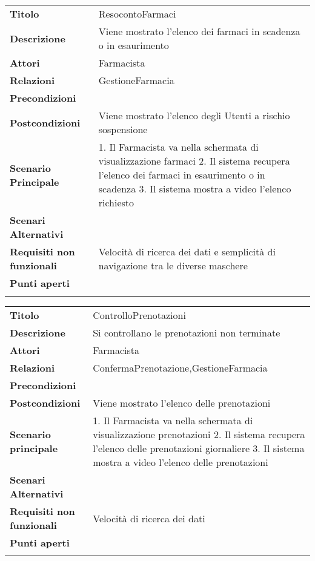 \begin{longtable}[c]{@{}ll@{}}
\toprule\addlinespace
\textbf{Titolo} & ResocontoFarmaci
\\\addlinespace
\textbf{Descrizione} & Viene mostrato l'elenco dei farmaci in scadenza o
in esaurimento
\\\addlinespace
\textbf{Attori} & Farmacista
\\\addlinespace
\textbf{Relazioni} & GestioneFarmacia
\\\addlinespace
\textbf{Precondizioni} &
\\\addlinespace
\textbf{Postcondizioni} & Viene mostrato l'elenco degli Utenti a rischio
sospensione
\\\addlinespace
\textbf{Scenario Principale} & 1. Il Farmacista va nella schermata di
visualizzazione farmaci 2. Il sistema recupera l'elenco dei farmaci in
esaurimento o in scadenza 3. Il sistema mostra a video l'elenco
richiesto
\\\addlinespace
\textbf{Scenari Alternativi} &
\\\addlinespace
\textbf{Requisiti non funzionali} & Velocità di ricerca dei dati e
semplicità di navigazione tra le diverse maschere
\\\addlinespace
\textbf{Punti aperti} &
\\\addlinespace
\bottomrule
\end{longtable}

\begin{longtable}[c]{@{}ll@{}}
\toprule\addlinespace
\textbf{Titolo} & ControlloPrenotazioni
\\\addlinespace
\textbf{Descrizione} & Si controllano le prenotazioni non terminate
\\\addlinespace
\textbf{Attori} & Farmacista
\\\addlinespace
\textbf{Relazioni} & ConfermaPrenotazione,GestioneFarmacia
\\\addlinespace
\textbf{Precondizioni} &
\\\addlinespace
\textbf{Postcondizioni} & Viene mostrato l'elenco delle prenotazioni
\\\addlinespace
\textbf{Scenario principale} & 1. Il Farmacista va nella schermata di
visualizzazione prenotazioni 2. Il sistema recupera l'elenco delle
prenotazioni giornaliere 3. Il sistema mostra a video l'elenco delle
prenotazioni
\\\addlinespace
\textbf{Scenari Alternativi} &
\\\addlinespace
\textbf{Requisiti non funzionali} & Velocità di ricerca dei dati
\\\addlinespace
\textbf{Punti aperti} &
\\\addlinespace
\bottomrule
\end{longtable}

